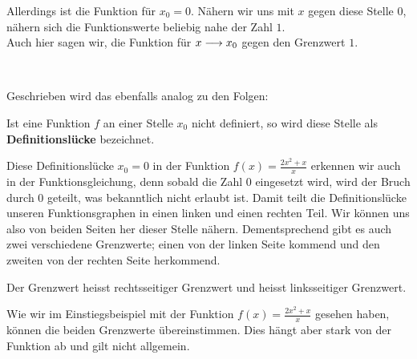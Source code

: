 \documentclass[11pt,oneside]{article}
\begin{document}
	\begin{minipage}{0.575\linewidth}
		Allerdings ist die Funktion  für $x_0=0$. Nähern wir uns mit $x$ gegen diese Stelle $0$, nähern sich die Funktionswerte beliebig nahe der Zahl $1$.\\ Auch hier sagen wir, die Funktion  für $x\longrightarrow x_0$ gegen den Grenzwert $1$.\\
	\end{minipage}
	\hfill
	\begin{minipage}{0.4\linewidth}
		\ \vspace{3.2cm}\\
	\end{minipage}
	Geschrieben wird das ebenfalls analog zu den Folgen:\vspace{6pt}\\
	\begin{definition}[Definitionslücke]
		Ist eine Funktion $f$ an einer Stelle $x_0$ nicht definiert, so wird diese Stelle als \textbf{Definitionslücke} bezeichnet.
	\end{definition}
	Diese Definitionslücke $x_0=0$ in der Funktion $f(x)=\frac{2x^2+x}{x}$ erkennen wir auch in der Funktionsgleichung, denn sobald die Zahl $0$ eingesetzt wird, wird der Bruch durch $0$ geteilt, was bekanntlich nicht erlaubt ist. Damit teilt die Definitionslücke unseren Funktionsgraphen in einen linken und einen rechten Teil. Wir können uns also von beiden Seiten her dieser Stelle nähern. Dementsprechend gibt es auch zwei verschiedene Grenzwerte; einen von der linken Seite kommend und den zweiten von der rechten Seite herkommend.
	\begin{definition}
		Der Grenzwert  heisst rechtsseitiger Grenzwert und  heisst linksseitiger Grenzwert.
	\end{definition}
	Wie wir im Einstiegsbeispiel mit der Funktion $f(x)=\frac{2x^2+x}{x}$ gesehen haben, können die beiden Grenzwerte übereinstimmen. Dies hängt aber stark von der Funktion ab und gilt nicht allgemein.
\end{document}
